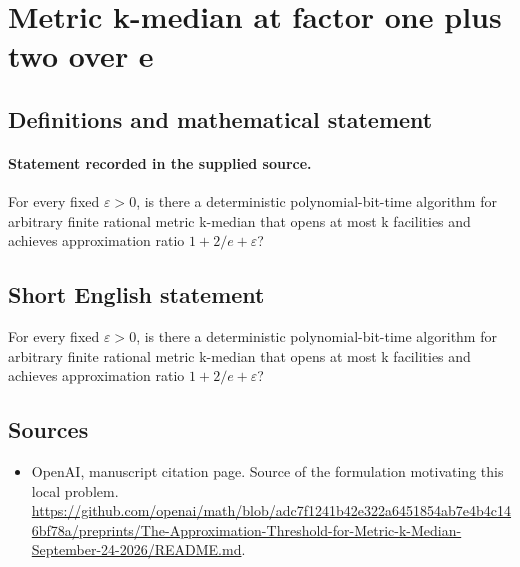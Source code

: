 \documentclass[11pt]{article}
\begin{document}
\section*{Metric k-median at factor one plus two over e}\label{statement}
\subsection{Definitions and mathematical statement}
\paragraph{Statement recorded in the supplied source.}
For every fixed $\varepsilon >0$, is there a deterministic polynomial-bit-time algorithm for arbitrary finite rational metric k-median that opens at most k facilities and achieves approximation ratio $1+2/e+\varepsilon $?
\subsection{Short English statement}
For every fixed $\varepsilon >0$, is there a deterministic polynomial-bit-time algorithm for arbitrary finite rational metric k-median that opens at most k facilities and achieves approximation ratio $1+2/e+\varepsilon $?
\subsection{Sources}
\begin{itemize}
\item[S1] OpenAI, manuscript citation page. Source of the formulation motivating this local problem.
\url{https://github.com/openai/math/blob/adc7f1241b42e322a6451854ab7e4b4c146bf78a/preprints/The-Approximation-Threshold-for-Metric-k-Median-September-24-2026/README.md}.
\end{itemize}
\end{document}
